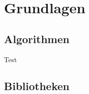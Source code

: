 \chapter{Grundlagen}


\section{Algorithmen}

Test \cite{Warren:2001:SMG:580358}

\section{Bibliotheken}
